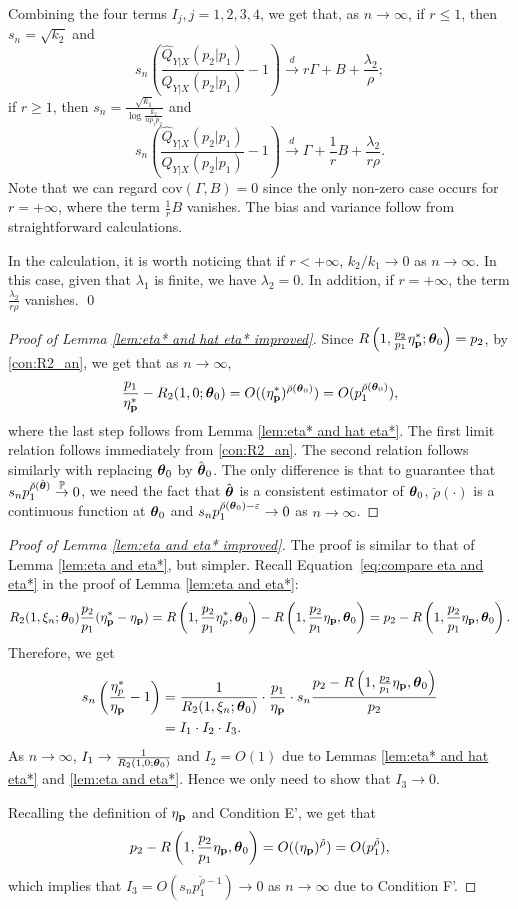     Combining the four terms $I_j, j=1,2,3,4$, we get that, as $n\to\infty$, if $r\leq 1$, then $s_n=\sqrt{k_2}$ and
    $$s_n\left( \frac{\widehat{Q}_{Y|X}(p_2|p_1)}{Q_{Y|X}(p_2|p_1)}- 1\right)\stackrel{d}{\to}r\Gamma+B+\frac{\lambda_2}{\rho};$$
    if $r\geq 1$, then $s_n=\frac{\sqrt{k_1}}{\log \frac{k_2}{np_1p_2}}$ and
    $$s_n\left( \frac{\widehat{Q}_{Y|X}(p_2|p_1)}{Q_{Y|X}(p_2|p_1)}-1\right)\stackrel{d}{\to}\Gamma+\frac{1}{r}B+\frac{\lambda_2}{r\rho}.$$
    Note that we can regard $\text{cov}(\Gamma,B)=0$ since the only non-zero case occurs for $r=+\infty$, where the term $\frac{1}{r}B$ vanishes. The bias and variance follow from straightforward calculations.

    In the calculation, it is worth noticing that if $r<+\infty$, $k_2/k_1\to 0$ as $n\to\infty$. In this case, given that $\lambda_1$ is finite, we have $\lambda_2=0$. In addition, if $r=+\infty$, the term $\frac{\lambda_2}{r\rho}$ vanishes.
\qed


\begin{proof}[Proof of Lemma \ref{lem:eta* and hat eta* improved}]
    Since $R\left(1,\frac{p_2}{p_1}\eta^*_{\mathbf p};\boldsymbol{\theta}_0\right) =p_2$, by \ref{con:R2_an}, we get that as $n\to\infty$,
    $$\frac{p_1}{\eta^*_{\mathbf p}}-R_2(1,0;\boldsymbol{\theta}_0)=O((\eta^*_{\mathbf p})^{\breve{\rho}(\boldsymbol{\theta}_0)})=O(p_1^{\breve{\rho}(\boldsymbol{\theta}_0)}),$$
    where the last step follows from Lemma \ref{lem:eta* and hat eta*}. The first limit relation follows immediately from \ref{con:R2_an}. The second relation follows similarly with replacing $\boldsymbol{\theta}_0$ by $\hat{\boldsymbol{\theta}}_0$. The only difference is that to guarantee that $s_np_1^{\breve{\rho}(\hat\thb)}\top 0$, we need the fact that $\hat{\boldsymbol{\theta}}$ is a consistent estimator of $\boldsymbol{\theta}_0$, $\breve{\rho}(\cdot)$ is a continuous function at $\boldsymbol{\theta}_0$ and $s_np_1^{\breve{\rho}(\boldsymbol{\theta}_0)-\varepsilon}\to 0$ as $n\to\infty$.
\end{proof}

\begin{proof}[Proof of Lemma \ref{lem:eta and eta* improved}]
    The proof is similar to that of Lemma \ref{lem:eta and eta*}, but simpler. Recall Equation~\eqref{eq:compare eta and eta*} in the proof of Lemma \ref{lem:eta and eta*}:
    $$R_2(1,\xi_n;\boldsymbol{\theta}_0)\frac{p_2}{p_1}(\eta^*_{\mathbf p}-\eta_{\mathbf p})=R\left(1,\frac{p_2}{p_1}\eta^*_p,\boldsymbol{\theta}_0\right)-R\left(1,\frac{p_2}{p_1}\eta_{\mathbf p},\boldsymbol{\theta}_0\right)=p_2-R\left(1,\frac{p_2}{p_1}\eta_{\mathbf p},\boldsymbol{\theta}_0\right).$$
    Therefore, we get
    \begin{align*}
        s_n\left(\frac{\eta^*_p}{\eta_{\mathbf p}}-1\right)&=\frac{1}{R_2(1,\xi_n;\boldsymbol{\theta}_0)}\cdot \frac{p_1}{\eta_{\mathbf p}} \cdot s_n \frac{p_2-R\left(1,\frac{p_2}{p_1}\eta_{\mathbf p},\boldsymbol{\theta}_0\right)}{p_2}\\
        &=I_1\cdot I_2\cdot I_3.
    \end{align*}
    As $n\to\infty$, $I_1\to \frac{1}{R_2(1,0;\boldsymbol{\theta}_0)}$ and $I_2=O(1)$ due to Lemmas \ref{lem:eta* and hat eta*} and \ref{lem:eta and eta*}. Hence we only need to show that $I_3\to 0$.

    Recalling the definition of $\eta_{\mathbf p}$ and Condition E', we get that
    $$p_2-R\left(1,\frac{p_2}{p_1}\eta_{\mathbf p},\boldsymbol{\theta}_0\right)=O((\eta_{\mathbf p})^{\tilde \rho})=O(p_1^{\tilde \rho}),$$
    which implies that $I_3=O(s_n p_1^{\tilde\rho-1})\to 0$ as $n\to\infty$ due to Condition F'.
\end{proof}


